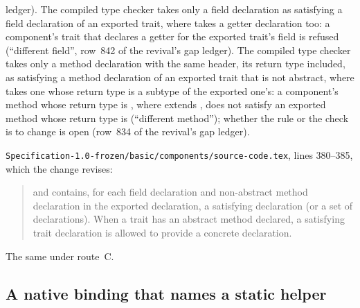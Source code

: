 \begin{description}
ledger).
The compiled type checker takes only a field declaration as satisfying a field
declaration of an exported trait, where  takes a
getter declaration too: a component's trait that declares a getter  for
the exported trait's field  is refused (``different field'', row~842 of
the revival's gap ledger).
The compiled type checker takes only a method declaration with the same
header, its return type included, as satisfying a method declaration of an
exported trait that is not abstract, where  takes one
whose return type is a subtype of the exported one's: a component's method
 whose return type is , where  extends , does not
satisfy an exported method  whose return type is  (``different
method''); whether the rule or the check is to change is open (row~834 of the
revival's gap ledger).
\item[Original text] \nolinkurl{Specification-1.0-frozen/basic/components/source-code.tex},
lines 380--385, which the change revises:
\begin{quote}
and contains,
for each field declaration and non-abstract method declaration
in the exported declaration,
a satisfying declaration (or a set of declarations).
When a trait has an abstract method declared,
a satisfying trait declaration is allowed to provide a concrete declaration.
\end{quote}
\item[Route C] The same under route~C.
\end{description}

\subsection{A native binding that names a static helper}

